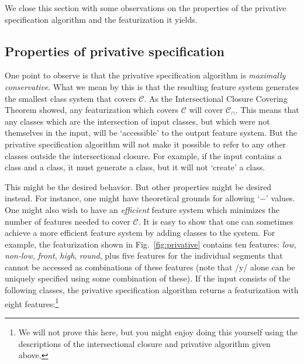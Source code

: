 \documentclass[11pt, oneside]{article}   	%
\begin{document}
We close this section with some observations on the properties of the privative specification algorithm and the featurization it yields. 

\subsection{Properties of privative specification}
\label{sec:priv_props}

One point to observe is that the privative specification algorithm is \textit{maximally conservative}. What we mean by this is that the resulting feature system generates the smallest class system that covers $\mathcal C$. As the Intersectional Closure Covering Theorem showed, any featurization which covers $\mathcal C$ will cover $\mathcal C_\cap$. This means that any classes which are the intersection of input classes, but which were not themselves in the input, will be `accessible' to the output feature system. But the privative specification algorithm will not make it possible to refer to any other classes outside the intersectional closure. For example, if the input contains a  class and a  class, it must generate a  class, but it will not `create' a  class.

This might be the desired behavior. But other properties might be desired instead. For instance, one might have theoretical grounds for allowing `$-$' values. One might also wish to have an \textit{efficient} feature system which minimizes the number of features needed to cover $\mathcal C$. It is easy to show that one can sometimes achieve a more efficient feature system by adding classes to the system. For example, the featurization shown in Fig.~\ref{fig:privative} contains ten features: \textit{low}, \textit{non-low}, \textit{front}, \textit{high}, \textit{round}, plus five features for the individual segments that cannot be accessed as combinations of these features (note that /y/ alone can be uniquely specified using some combination of these). If the input consists of the following classes, the privative specification algorithm returns a featurization with eight features:\footnote{We will not prove this here, but you might enjoy doing this yourself using the descriptions of the intersectional closure and privative algorithm given above.}
\end{document}
